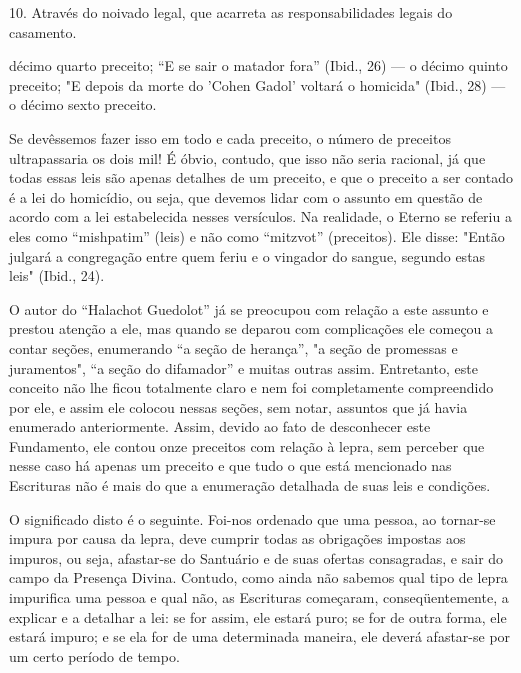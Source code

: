 10. Através do noivado legal, que acarreta as responsabilidades legais
do casamento.

décimo quarto preceito; ``E se sair o matador fora'' (Ibid., 26) --- o
décimo quinto preceito; "E depois da morte do 'Cohen Gadol' voltará o
homicida" (Ibid., 28) --- o décimo sexto preceito.

Se devêssemos fazer isso em todo e cada preceito, o número de pre­ceitos
ultrapassaria os dois mil! É óbvio, contudo, que isso não seria
racional, já que todas essas leis são apenas detalhes de um preceito, e
que o preceito a ser contado é a lei do homicídio, ou seja, que devemos
lidar com o assunto em questão de acordo com a lei estabelecida nesses
versículos. Na realidade, o Eterno se referiu a eles como ``mishpatim''
(leis) e não como ``mitzvot'' (pre­ceitos). Ele disse: "Então julgará a
congregação entre quem feriu e o vingador do sangue, segundo estas leis"
(Ibid., 24).

O autor do ``Halachot Guedolot'' já se preocupou com relação a es­te
assunto e prestou atenção a ele, mas quando se deparou com complicações
ele começou a contar seções, enumerando ``a seção de herança'', "a seção
de promessas e juramentos", ``a seção do difamador'' e muitas outras
assim. En­tretanto, este conceito não lhe ficou totalmente claro e nem
foi completamen­te compreendido por ele, e assim ele colocou nessas
seções, sem notar, assun­tos que já havia enumerado anteriormente.
Assim, devido ao fato de desconhe­cer este Fundamento, ele contou onze
preceitos com relação à lepra, sem per­ceber que nesse caso há apenas um
preceito e que tudo o que está mencionado nas Escrituras não é mais do
que a enumeração detalhada de suas leis e condições.

O significado disto é o seguinte. Foi-nos ordenado que uma pessoa, ao
tornar-se impura por causa da lepra, deve cumprir todas as obrigações
im­postas aos impuros, ou seja, afastar-se do Santuário e de suas
ofertas consagra­das, e sair do campo da Presença Divina. Contudo, como
ainda não sabemos qual tipo de lepra impurifica uma pessoa e qual não,
as Escrituras começaram, conseqüentemente, a explicar e a detalhar a
lei: se for assim, ele estará puro; se for de outra forma, ele estará
impuro; e se ela for de uma determinada ma­neira, ele deverá afastar-se
por um certo período de tempo.

